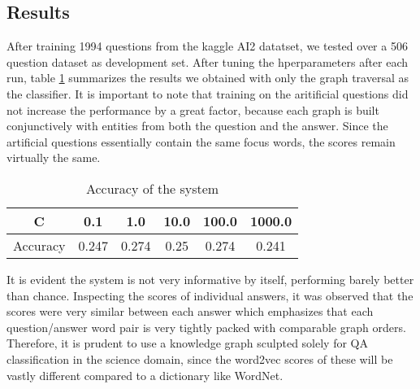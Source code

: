 \subsection{Results}
After training 1994 questions from the kaggle AI2 datatset, we tested over a 506 question dataset
as development set. After tuning the hperparameters after each run, table \ref{wngraph} summarizes
the results we obtained with only the graph traversal as the classifier. It is important to note
that training on the aritificial questions did not increase the performance by a great factor,
because each graph is built conjunctively with entities from both the question and the answer.
Since the artificial questions essentially contain the same focus words, the scores remain virtually
the same.

\begin{table}[htp]
\caption{Accuracy of the system}
\begin{center}
\begin{tabular}{|c|c|c|c|c|c|}
\hline
C&0.1&1.0&10.0&100.0&1000.0\\\hline
Accuracy&0.247&0.274&0.25&0.274&0.241\\
\hline
\end{tabular}
\end{center}
\label{wngraph}
\end{table}

It is evident the system is not very informative by itself, performing barely better than chance. Inspecting
the scores of individual answers, it was observed that the scores were very similar between each answer
which emphasizes that each question/answer word pair is very tightly packed with comparable graph
orders. Therefore, it is prudent to use a knowledge graph sculpted solely for QA classification in the
science domain, since the word2vec scores of these will be vastly different compared to a dictionary
like WordNet.